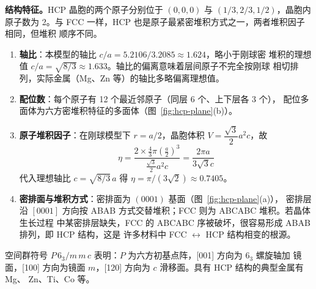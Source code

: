 \textbf{结构特征。}HCP 晶胞的两个原子分别位于 $(0,0,0)$ 与 $(1/3,2/3,1/2)$，晶胞内
原子数为 2。与 FCC 一样，HCP 也是原子最紧密堆积方式之一，两者堆积因子相同，但堆积
顺序不同。

\begin{enumerate}[label=（\arabic*）]
  \item \textbf{轴比}：本模型的轴比 $c/a=5.2106/3.2085\approx1.624$，略小于刚球密
    堆积的理想值 $c/a=\sqrt{8/3}\approx1.633$。轴比的偏离意味着层间原子不完全按刚球
    相切排列，实际金属（Mg、Zn 等）的轴比多略偏离理想值。
  \item \textbf{配位数}：每个原子有 12 个最近邻原子（同层 6 个、上下层各 3 个），
    配位多面体为六方密堆积特征的多面体（图~\ref{fig:hcp-plane}(b)）。
  \item \textbf{原子堆积因子}：在刚球模型下 $r=a/2$，晶胞体积
    $V=\dfrac{\sqrt{3}}{2}a^2c$，故
    \begin{equation}
      \eta=\frac{2\times\frac{4}{3}\pi\left(\frac{a}{2}\right)^3}
                {\frac{\sqrt{3}}{2}a^2c}
        =\frac{2\pi a}{3\sqrt{3}c}
    \end{equation}
    代入理想轴比 $c=\sqrt{8/3}\,a$ 得 $\eta=\pi/(3\sqrt{2})\approx0.7405$。
  \item \textbf{密排面与堆积方式}：密排面为 $(0001)$ 基面（图~\ref{fig:hcp-plane}(a)），
    密排层沿 $[0001]$ 方向按 ABAB 方式交替堆积；FCC 则为 ABCABC 堆积。若晶体生长过程
    中某密排层缺失，FCC 的 ABCABC 序被破坏，很容易形成 ABAB 排列，即 HCP 结构，这是
    许多材料中 FCC $\leftrightarrow$ HCP 结构相变的根源。
\end{enumerate}

空间群符号 $P\,6_3/m\,m\,c$ 表明：$P$ 为六方初基点阵，[001] 方向为 $6_3$ 螺旋轴加
镜面，[100] 方向为镜面 $m$，[120] 方向为 $c$ 滑移面。具有 HCP 结构的典型金属有 Mg、
Zn、Ti、Co 等。
